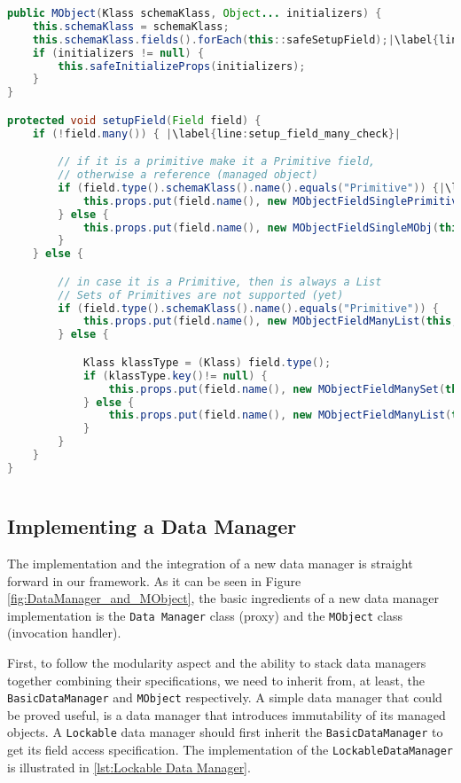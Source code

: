 \begin{sourcecode} [H]
	\begin{lstlisting}[language=Java, escapechar=|]
public MObject(Klass schemaKlass, Object... initializers) {
	this.schemaKlass = schemaKlass;
	this.schemaKlass.fields().forEach(this::safeSetupField);|\label{line:setup_fields}|
	if (initializers != null) {
		this.safeInitializeProps(initializers);
	}
}

protected void setupField(Field field) {
	if (!field.many()) { |\label{line:setup_field_many_check}|

		// if it is a primitive make it a Primitive field, 
		// otherwise a reference (managed object)
		if (field.type().schemaKlass().name().equals("Primitive")) {|\label{line:instanceof}|
			this.props.put(field.name(), new MObjectFieldSinglePrimitive(this, field));
		} else {
			this.props.put(field.name(), new MObjectFieldSingleMObj(this, field));
		}
	} else {

		// in case it is a Primitive, then is always a List
		// Sets of Primitives are not supported (yet)
		if (field.type().schemaKlass().name().equals("Primitive")) {
			this.props.put(field.name(), new MObjectFieldManyList(this, field));
		} else {

			Klass klassType = (Klass) field.type();
			if (klassType.key()!= null) {
				this.props.put(field.name(), new MObjectFieldManySet(this, field));
			} else {
				this.props.put(field.name(), new MObjectFieldManyList(this, field));
			}
		}
	}
}
	\end{lstlisting}
	\caption{MObject: setup fields}
	\label{lst:setup_fields}
\end{sourcecode}

\subsection{Implementing a Data Manager}\label{Implementing a Data Manager}
The implementation and the integration of a new data manager is straight forward in our framework.
As it can be seen in Figure \ref{fig:DataManager_and_MObject}, the basic ingredients of a new data manager implementation is the \texttt{Data Manager} class (proxy) and the \texttt{MObject} class (invocation handler).

First, to follow the modularity aspect and the ability to stack data managers together combining their specifications, we need to inherit from, at least, the \texttt{BasicDataManager} and \texttt{MObject} respectively.
A simple data manager that could be proved useful, is a data manager that introduces immutability of its managed objects.
A \texttt{Lockable} data manager should first inherit the \texttt{BasicDataManager} to get its field access specification.
The implementation of the \texttt{LockableDataManager} is illustrated in \ref{lst:Lockable Data Manager}.

